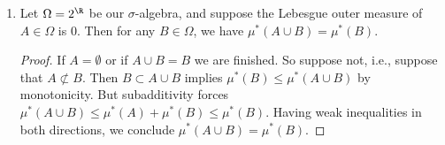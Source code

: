 \documentclass[onesided]{ccg-pset}
\begin{document}
\begin{enumerate}
\begin{proof}
    Because the Lebesgue outer measure of an interval $I$ is the length of that interval, the outer measure of the disjoint union of the $J_j$ is equal to the outer measure of the disjoint union of the refinement $\tilde I_k$, which, by monotonicity, is at most the sum of the outer measures of the original finite cover $\set{I_k}$, ie,
    \begin{equation}
        \label{bound}
        \sum\limits_{j=0}^{n+1}\ell(J_j) = \sum\limits_{j=0}^{n+1}\mu^*(J_j) = \sum\limits_{k=1}^{n} \mu^*(\tilde I_k) \le \sum\limits_{k=1}^{n}\mu^*(I_k).
    \end{equation}
    Taking the infimum over the possible finite open covers of $D$, the left most term in equation \eqref{bound} is exactly the infimum in the left hand side of the equation \ref{riemannupper}, which is the value of Riemann-Stieljies upper integral of $\chi_D$, which is $1$, as desired.
\end{proof}
\item Let $\Omega = 2^\R$ be our $\sigma$-algebra, and suppose the Lebesgue outer measure of $A \in \Omega$ is $0$. Then for any $B \in \Omega$, we have $\mu^*(A\cup B) = \mu^*(B)$.
    \begin{proof}
        If $A = \emptyset$ or if $A \cup B = B$ we are finished. So suppose not, i.e., suppose that $A \not\subset B$. Then $B \subset A \cup B$ implies $\mu^*(B) \le \mu^*(A \cup B)$ by monotonicity. But subadditivity forces $\mu^*(A \cup B) \le \mu^*(A) + \mu^*(B) \le \mu^*(B)$. Having weak inequalities in both directions, we conclude $\mu^*(A \cup B) = \mu^*(B)$.
    \end{proof}
\end{enumerate}



\end{document}
